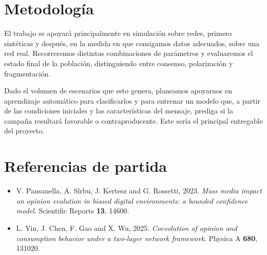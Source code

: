 \documentclass[11pt]{article}
\begin{document}
\section*{Metodología}

El trabajo se apoyará principalmente en simulación sobre redes, primero sintéticas y
después, en la medida en que consigamos datos adecuados, sobre una red real. Recorreremos
distintas combinaciones de parámetros y evaluaremos el estado final de la población,
distinguiendo entre consenso, polarización y fragmentación.

Dado el volumen de escenarios que esto genera, planeamos apoyarnos en aprendizaje
automático para clasificarlos y para entrenar un modelo que, a partir de las condiciones
iniciales y las características del mensaje, prediga si la campaña resultará favorable o
contraproducente. Este sería el principal entregable del proyecto.

\section*{Referencias de partida}

\begin{itemize}
	\item V. Pansanella, A. Sîrbu, J. Kertesz and G. Rossetti, 2023.
	      \emph{Mass media impact on opinion evolution in biased digital environments: a bounded confidence model}.
	      Scientific Reports \textbf{13}, 14600.

	\item L. Yin, J. Chen, F. Gao and X. Wu, 2025.
	      \emph{Coevolution of opinion and consumption behavior under a two-layer network framework}.
	      Physica A \textbf{680}, 131020.
\end{itemize}
\end{document}
